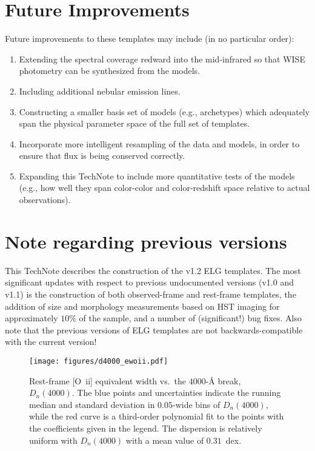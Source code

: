 \documentclass[12pt]{article}
\newcommand{\oii}{[O~{\sc ii}]}
\begin{document}
\section{Future Improvements}

Future improvements to these templates may include (in no particular
order): 

\begin{enumerate}
\item{Extending the spectral coverage redward into the mid-infrared so
  that WISE photometry can be synthesized from the models.}
\item{Including additional nebular emission lines.}
\item{Constructing a smaller basis set of models (e.g., archetypes)
  which adequately span the physical parameter space of the full set
  of templates.}
\item{Incorporate more intelligent resampling of the data and models,
  in order to ensure that flux is being conserved correctly.}
\item{Expanding this TechNote to include more quantitative tests of
  the models (e.g., how well they span color-color and color-redshift
  space relative to actual observations).}
\end{enumerate}

\section{Note regarding previous versions}

This TechNote describes the construction of the v1.2 ELG templates.
The most significant updates with respect to previous undocumented
versions (v1.0 and v1.1) is the construction of both observed-frame
and rest-frame templates, the addition of size and morphology
measurements based on HST imaging for approximately $10\%$ of the
sample, and a number of (significant!) bug fixes.  Also note that the
previous versions of ELG templates are not backwards-compatible with
the current version!

\begin{figure}
\centering
\texttt{[image: figures/d4000\_ewoii.pdf]}
\caption{Rest-frame \oii{} equivalent width vs.~the $4000$-\AA{}
  break, $D_{n}(4000)$.  The blue points and uncertainties indicate
  the running median and standard deviation in $0.05$-wide bins of
  $D_{n}(4000)$, while the red curve is a third-order polynomial fit
  to the points with the coefficients given in the
  legend.  The dispersion is relatively uniform with $D_{n}(4000)$
  with a mean value of $0.31$~dex.  \label{fig:d4000}} 
\end{figure}



%
\end{document}
